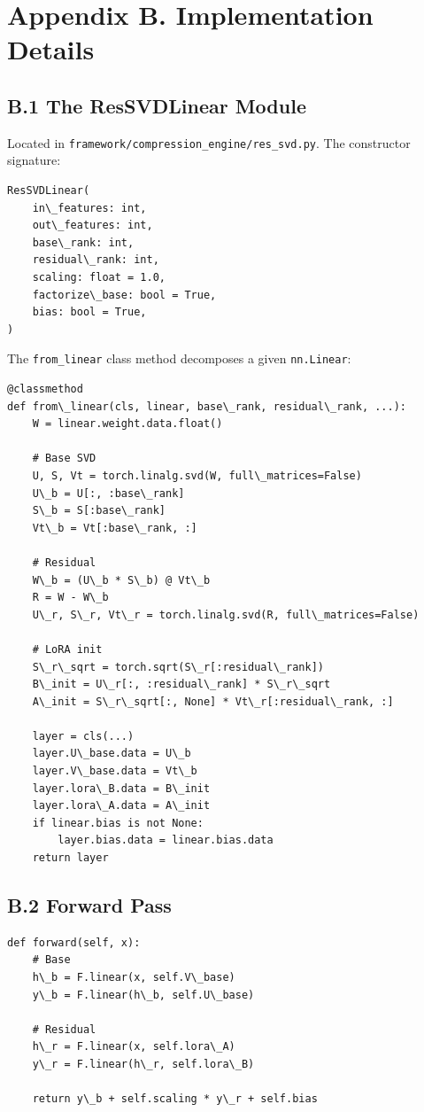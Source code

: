 \section{Appendix B. Implementation Details}

\subsection{B.1 The ResSVDLinear Module}

Located in \texttt{framework/compression\_engine/res\_svd.py}. The constructor 
signature:

\begin{lstlisting}
ResSVDLinear(
    in\_features: int,
    out\_features: int,
    base\_rank: int,
    residual\_rank: int,
    scaling: float = 1.0,
    factorize\_base: bool = True,
    bias: bool = True,
)
\end{lstlisting}

The \texttt{from\_linear} class method decomposes a given \texttt{nn.Linear}:

\begin{lstlisting}
@classmethod
def from\_linear(cls, linear, base\_rank, residual\_rank, ...):
    W = linear.weight.data.float()
    
    # Base SVD
    U, S, Vt = torch.linalg.svd(W, full\_matrices=False)
    U\_b = U[:, :base\_rank]
    S\_b = S[:base\_rank]
    Vt\_b = Vt[:base\_rank, :]
    
    # Residual
    W\_b = (U\_b * S\_b) @ Vt\_b
    R = W - W\_b
    U\_r, S\_r, Vt\_r = torch.linalg.svd(R, full\_matrices=False)
    
    # LoRA init
    S\_r\_sqrt = torch.sqrt(S\_r[:residual\_rank])
    B\_init = U\_r[:, :residual\_rank] * S\_r\_sqrt
    A\_init = S\_r\_sqrt[:, None] * Vt\_r[:residual\_rank, :]
    
    layer = cls(...)
    layer.U\_base.data = U\_b
    layer.V\_base.data = Vt\_b
    layer.lora\_B.data = B\_init
    layer.lora\_A.data = A\_init
    if linear.bias is not None:
        layer.bias.data = linear.bias.data
    return layer
\end{lstlisting}

\subsection{B.2 Forward Pass}

\begin{lstlisting}
def forward(self, x):
    # Base
    h\_b = F.linear(x, self.V\_base)
    y\_b = F.linear(h\_b, self.U\_base)
    
    # Residual
    h\_r = F.linear(x, self.lora\_A)
    y\_r = F.linear(h\_r, self.lora\_B)
    
    return y\_b + self.scaling * y\_r + self.bias
\end{lstlisting}


